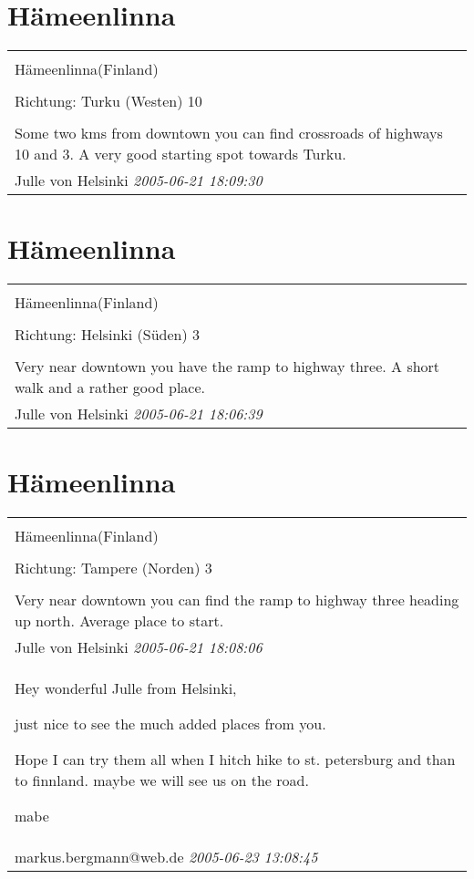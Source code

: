 \documentclass[a4paper,12pt]{article}
\begin{document}
\section{Hämeenlinna}
\begin{tabular}{|p{13cm}|}
\hline\\
Hämeenlinna(Finland)\\
\\
Richtung: Turku (Westen) 10 \\
\hline\\
Some two kms from downtown you can find crossroads of highways 10 and 3. A very good starting spot towards Turku. \\
Julle von Helsinki \textit{ 2005-06-21 18:09:30 }\\\hline
\end{tabular}


\section{Hämeenlinna}
\begin{tabular}{|p{13cm}|}
\hline\\
Hämeenlinna(Finland)\\
\\
Richtung: Helsinki (Süden) 3 \\
\hline\\
Very near downtown you have the ramp to highway three. A short walk and a rather good place. \\
Julle von Helsinki \textit{ 2005-06-21 18:06:39 }\\\hline
\end{tabular}


\section{Hämeenlinna}
\begin{tabular}{|p{13cm}|}
\hline\\
Hämeenlinna(Finland)\\
\\
Richtung: Tampere (Norden) 3 \\
\hline\\
Very near downtown you can find the ramp to highway three heading up north. Average place to start. \\
Julle von Helsinki \textit{ 2005-06-21 18:08:06 }\\\hline Hey wonderful Julle from Helsinki,

just nice to see the much added places from you.

Hope I can try them all when I hitch hike to st. petersburg and than to finnland. maybe we will see us on the road.

mabe \\
markus.bergmann@web.de \textit{ 2005-06-23 13:08:45 }\\\hline
\end{tabular}
\end{document}
